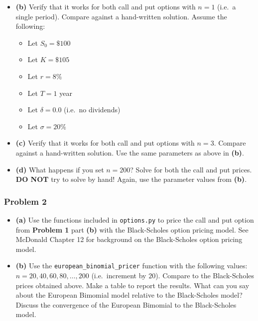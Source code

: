 \documentclass[
]{article}
\providecommand{\tightlist}{%
  \setlength{\itemsep}{0pt}\setlength{\parskip}{0pt}}
\begin{document}
\begin{itemize}
\tightlist
\item
  \textbf{(b)} Verify that it works for both call and put options with
  \(n = 1\) (i.e.~a single period). Compare against a hand-written
  solution. Assume the following:

  \begin{itemize}
  \tightlist
  \item
    Let \(S_{0} = \$100\)
  \item
    Let \(K = \$105\)
  \item
    Let \(r = 8\%\)
  \item
    Let \(T = 1\) year
  \item
    Let \(\delta = 0.0\) (i.e.~no dividends)
  \item
    Let \(\sigma = 20\%\)
  \end{itemize}
\end{itemize}

\begin{itemize}
\tightlist
\item
  \textbf{(c)} Verify that it works for both call and put options with
  \(n = 3\). Compare against a hand-written solution. Use the same
  parameters as above in \textbf{(b)}.
\end{itemize}

\begin{itemize}
\tightlist
\item
  \textbf{(d)} What happens if you set \(n = 200\)? Solve for both the
  call and put prices. \textbf{DO NOT} try to solve by hand! Again, use
  the parameter values from \textbf{(b)}.
\end{itemize}

\hypertarget{problem-2}{%
\subsubsection{\texorpdfstring{\textbf{Problem
2}}{Problem 2}}\label{problem-2}}

\begin{itemize}
\tightlist
\item
  \textbf{(a)} Use the functions included in \texttt{options.py} to
  price the call and put option from \textbf{Problem 1} part
  \textbf{(b)} with the Black-Scholes option pricing model. See McDonald
  Chapter 12 for background on the Black-Scholes option pricing model.
\end{itemize}

\begin{itemize}
\tightlist
\item
  \textbf{(b)} Use the \texttt{european\_binomial\_pricer} function with
  the following values: \(n = 20, 40, 60, 80, \ldots, 200\)
  (i.e.~increment by \(20\)). Compare to the Black-Scholes prices
  obtained above. Make a table to report the results. What can you say
  about the European Bimomial model relative to the Black-Scholes model?
  Discuss the convergence of the European Bimomial to the Black-Scholes
  model.
\end{itemize}
\end{document}
